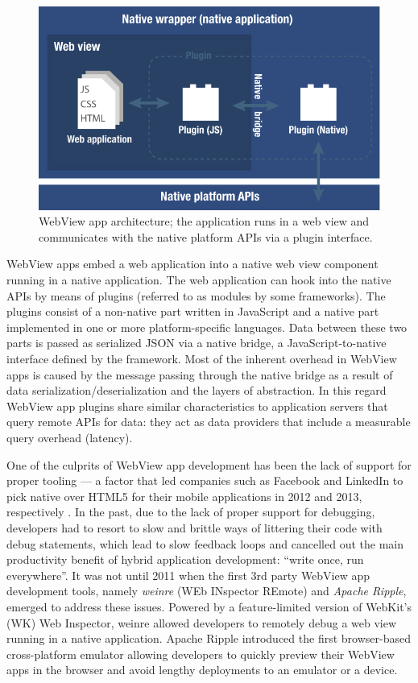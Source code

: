 \documentclass[thesis.tex]{subfiles}
\begin{document}
\begin{figure}[ht]
\centering \includegraphics[width=\textwidth]{images/web-view-app-structure}
\caption{WebView app architecture; the application runs in a web view and communicates with the native platform APIs via a plugin interface.\label{fig:web-view-app}}
\end{figure}

WebView apps embed a web application into a native web view component running in a native application. The web application can hook into the native APIs by means of plugins (referred to as modules by some frameworks). The plugins consist of a non-native part written in JavaScript and a native part implemented in one or more platform-specific languages. Data between these two parts is passed as serialized JSON via a native bridge, a JavaScript-to-native interface defined by the framework. Most of the inherent overhead in WebView apps is caused by the message passing through the native bridge as a result of data serialization/deserialization and the layers of abstraction. In this regard WebView app plugins share similar characteristics to application servers that query remote APIs for data: they act as data providers that include a measurable query overhead (latency).

One of the culprits of WebView app development has been the lack of support for proper tooling --- a factor that led companies such as Facebook and LinkedIn to pick native over HTML5 for their mobile applications in 2012 and 2013, respectively \cite{html_vs_native_facebook}\cite{html_vs_native_linkedin}. In the past, due to the lack of proper support for debugging, developers had to resort to slow and brittle ways of littering their code with debug statements, which lead to slow feedback loops and cancelled out the main productivity benefit of hybrid application development: ``write once, run everywhere''. It was not until 2011 when the first 3rd party WebView app development tools, namely \textit{weinre} (WEb INspector REmote) and \textit{Apache Ripple}, emerged to address these issues. Powered by a feature-limited version of WebKit's (WK) Web Inspector, weinre allowed developers to remotely debug a web view running in a native application. Apache Ripple introduced the first browser-based cross-platform emulator allowing developers to quickly preview their WebView apps in the browser and avoid lengthy deployments to an emulator or a device.
\end{document}
